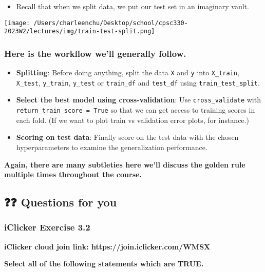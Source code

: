 \documentclass[11pt]{article}
\providecommand{\tightlist}{%
      \setlength{\itemsep}{0pt}\setlength{\parskip}{0pt}}
\begin{document}
\begin{itemize}
\tightlist
\item
  Recall that when we split data, we put our test set in an imaginary
  vault.
\end{itemize}

\texttt{[image: /Users/charleenchu/Desktop/school/cpsc330-2023W2/lectures/img/train-test-split.png]}

    \subsubsection{Here is the workflow we'll generally
follow.}\label{here-is-the-workflow-well-generally-follow.}

\begin{itemize}
\tightlist
\item
  \textbf{Splitting}: Before doing anything, split the data \texttt{X}
  and \texttt{y} into \texttt{X\_train}, \texttt{X\_test},
  \texttt{y\_train}, \texttt{y\_test} or \texttt{train\_df} and
  \texttt{test\_df} using \texttt{train\_test\_split}.
\item
  \textbf{Select the best model using cross-validation}: Use
  \texttt{cross\_validate} with \texttt{return\_train\_score\ =\ True}
  so that we can get access to training scores in each fold. (If we want
  to plot train vs validation error plots, for instance.)
\item
  \textbf{Scoring on test data}: Finally score on the test data with the
  chosen hyperparameters to examine the generalization performance.
\end{itemize}

\textbf{Again, there are many subtleties here we'll discuss the golden
rule multiple times throughout the course.}

    

    \subsection{❓❓ Questions for you}\label{questions-for-you}

    \subsubsection{iClicker Exercise 3.2}\label{iclicker-exercise-3.2}

\textbf{iClicker cloud join link: https://join.iclicker.com/WMSX}

\textbf{Select all of the following statements which are TRUE.}
\end{document}
